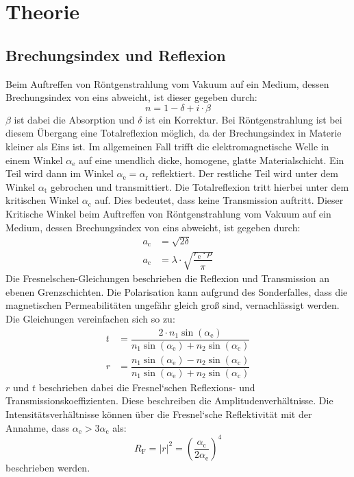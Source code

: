 
\section{Theorie}
\label{sec:Theorie}
\subsection{Brechungsindex und Reflexion}
\label{sec:Brechungsindex}
Beim Auftreffen von Röntgenstrahlung vom Vakuum auf ein Medium, dessen Brechungsindex von eins abweicht, ist dieser gegeben durch:
\begin{equation}
  \label{eqn:Brechungsindex}
  n=1-\delta+ i\cdot \beta
\end{equation}
$\beta$ ist dabei die Absorption und $\delta$ ist ein Korrektur. Bei Röntgenstrahlung ist bei diesem Übergang eine Totalreflexion möglich, da der Brechungsindex in Materie kleiner als Eins ist. Im allgemeinen Fall trifft die elektromagnetische Welle in einem Winkel $\alpha_\mathrm{e}$ auf eine unendlich dicke, homogene, glatte Materialschicht. Ein Teil wird dann im Winkel $\alpha_\mathrm{e}=\alpha_\mathrm{r}$ reflektiert. Der restliche Teil wird unter dem Winkel $\alpha_\mathrm{t}$ gebrochen und transmittiert. Die Totalreflexion tritt hierbei unter dem kritischen Winkel $\alpha_\mathrm{c}$ auf. Dies bedeutet, dass keine Transmission auftritt. Dieser Kritische Winkel beim Auftreffen von Röntgenstrahlung vom Vakuum auf ein Medium, dessen Brechungsindex von eins abweicht, ist gegeben durch:
\begin{align}
  \label{eqn:Totalreflexion}
  a_\mathrm{c} &= \sqrt{2 \delta} \\
  a_\mathrm{c} &= \lambda\cdot\sqrt{\dfrac{r_\mathrm{e}\cdot\rho}{\pi}}
\end{align}
Die Fresnelschen-Gleichungen beschrieben die Reflexion und Transmission an ebenen Grenzschichten. Die Polarisation kann aufgrund des Sonderfalles, dass die magnetischen Permeabilitäten ungefähr gleich groß sind, vernachlässigt werden. Die Gleichungen vereinfachen sich so zu:
\begin{align}
  \label{eqn:Fresnelschen-Gleichungenl}
  t &= \dfrac{2\cdot n_\mathrm{1} \sin(\alpha_\mathrm{e}) }{n_\mathrm{1} \sin(\alpha_\mathrm{e})+ n_\mathrm{2} \sin(\alpha_\mathrm{c})}\\
  r &= \dfrac{n_\mathrm{1} \sin(\alpha_\mathrm{e})-n_\mathrm{2}\sin(\alpha_\mathrm{c})}{n_\mathrm{1}\sin(\alpha_\mathrm{e})+n_\mathrm{2} \sin(\alpha_\mathrm{c})}
\end{align}
$r$ und $t$ beschrieben dabei die Fresnel`schen Reflexions- und Transmissionskoeffizienten. Diese beschreiben die Amplitudenverhältnisse. Die Intensitätsverhältnisse können über die Fresnel`sche Reflektivität mit der Annahme, dass $\alpha_\mathrm{e} >3 \alpha_\mathrm{c}$ als:
\begin{equation}
  \label{eqn:Fresnelref}
 R_\mathrm{F} =|r|^2 =\left(\dfrac{\alpha_\mathrm{c}}{2\alpha_\mathrm{e}}\right)^4
\end{equation}
beschrieben werden.
